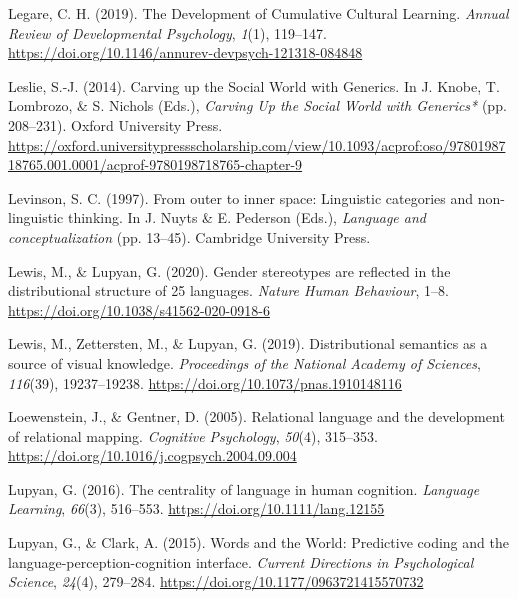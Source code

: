 \documentclass[11pt,man]{article}
\newenvironment{CSLReferences}%
  {}%
  {\par}
\begin{document}
\begin{CSLReferences}{1}{0}
\leavevmode{}%
Legare, C. H. (2019). The {Development} of {Cumulative Cultural
Learning}. \emph{Annual Review of Developmental Psychology},
\emph{1}(1), 119--147.
\url{https://doi.org/10.1146/annurev-devpsych-121318-084848}

\leavevmode{}%
Leslie, S.-J. (2014). Carving up the {Social World} with {Generics}. In
J. Knobe, T. Lombrozo, \& S. Nichols (Eds.), \emph{Carving {Up} the
{Social World} with {Generics}*} (pp. 208--231). {Oxford University
Press}.
\url{https://oxford.universitypressscholarship.com/view/10.1093/acprof:oso/9780198718765.001.0001/acprof-9780198718765-chapter-9}

\leavevmode{}%
Levinson, S. C. (1997). From outer to inner space: {Linguistic}
categories and non-linguistic thinking. In J. Nuyts \& E. Pederson
(Eds.), \emph{Language and conceptualization} (pp. 13--45). {Cambridge
University Press}.

\leavevmode{}%
Lewis, M., \& Lupyan, G. (2020). Gender stereotypes are reflected in the
distributional structure of 25 languages. \emph{Nature Human Behaviour},
1--8. \url{https://doi.org/10.1038/s41562-020-0918-6}

\leavevmode{}%
Lewis, M., Zettersten, M., \& Lupyan, G. (2019). Distributional
semantics as a source of visual knowledge. \emph{Proceedings of the
National Academy of Sciences}, \emph{116}(39), 19237--19238.
\url{https://doi.org/10.1073/pnas.1910148116}

\leavevmode{}%
Loewenstein, J., \& Gentner, D. (2005). Relational language and the
development of relational mapping. \emph{Cognitive Psychology},
\emph{50}(4), 315--353.
\url{https://doi.org/10.1016/j.cogpsych.2004.09.004}

\leavevmode{}%
Lupyan, G. (2016). The centrality of language in human cognition.
\emph{Language Learning}, \emph{66}(3), 516--553.
\url{https://doi.org/10.1111/lang.12155}

\leavevmode{}%
Lupyan, G., \& Clark, A. (2015). Words and the {World}: {Predictive}
coding and the language-perception-cognition interface. \emph{Current
Directions in Psychological Science}, \emph{24}(4), 279--284.
\url{https://doi.org/10.1177/0963721415570732}


\end{CSLReferences}
\end{document}
